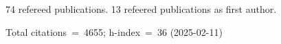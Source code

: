 74 refereed publications. 13 refeered publications as first author.

Total citations~=~4655; h-index~=~36 (2025-02-11)